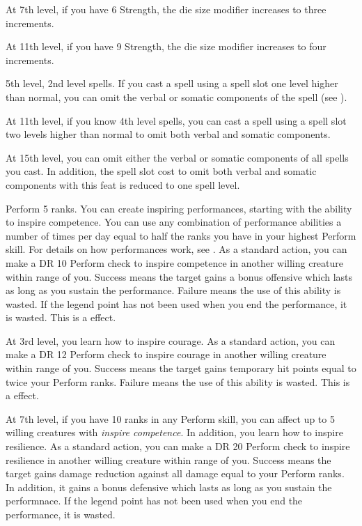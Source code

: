     At 7th level, if you have 6 Strength, the die size modifier increases to three increments.

    At 11th level, if you have 9 Strength, the die size modifier increases to four increments.

    \featpre 5th level, 2nd level spells.
    \featben If you cast a spell using a spell slot one level higher than normal, you can omit the verbal or somatic components of the spell (see ).

    At 11th level, if you know 4th level spells, you can cast a spell using a spell slot two levels higher than normal to omit both verbal and somatic components.

    At 15th level, you can omit either the verbal or somatic components of all spells you cast.
    In addition, the spell slot cost to omit both verbal and somatic components with this feat is reduced to one spell level.

    \featpre Perform 5 ranks.
    \featben You can create inspiring performances, starting with the ability to inspire competence.
    You can use any combination of performance abilities a number of times per day equal to half the ranks you have in your highest Perform skill.
    For details on how performances work, see .
    As a standard action, you can make a DR 10 Perform check to inspire competence in another willing creature within \rngmed range of you.
    Success means the target gains a bonus offensive  which lasts as long as you sustain the performance.
    Failure means the use of this ability is wasted.
    If the legend point has not been used when you end the performance, it is wasted.
    This is a  effect.

    At 3rd level, you learn how to inspire courage.
     As a standard action, you can make a DR 12 Perform check to inspire courage in another willing creature within \rngmed range of you.
    Success means the target gains temporary hit points equal to twice your Perform ranks.
    Failure means the use of this ability is wasted.
    This is a  effect.

    At 7th level, if you have 10 ranks in any Perform skill, you can affect up to 5 willing creatures with \textit{inspire competence}.
    In addition, you learn how to inspire resilience.
     As a standard action, you can make a DR 20 Perform check to inspire resilience in another willing creature within \rngmed range of you.
    Success means the target gains damage reduction against all damage equal to your Perform ranks.
    In addition, it gains a bonus defensive  which lasts as long as you sustain the performnace.
    If the legend point has not been used when you end the performance, it is wasted.

